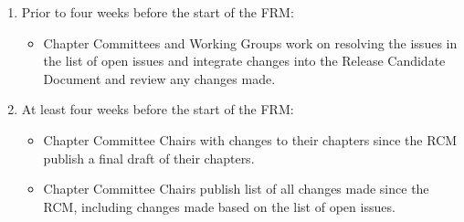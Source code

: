 {{\begin{enumerate}
\begin{enumerate}
  \item The ratification can be ``fast tracked'' if the following
    conditions are true:

    \begin{itemize}
    \item The first ballot on the Release Candidate Draft MPI Standard
      Document passed.
    \item  The list of still-unresolved issues is empty.
    \item The Forum resolved all other minor issues, such as
      formatting and whitespace problems, spelling errors, and other
      typos, and the MPI Standard Document Editor has produced a new
      Release Candidate Document containing all these fixes.
    \item After a new Release Candidate Document is available, the
      Forum decides, via special formal ballot, to ``fast track'' the
      ratification.  The ballot passes if:
      \begin{enumerate}
      \item The ballot meets the requirements for the individual
        ballot quorum, and
      \item There are zero ``no'' votes.
      \end{enumerate}
    \end{itemize}

    \item If all conditions are met, the ratification is fast tracked,
      steps 6 through 9b) are skipped, and step 9c) can be performed
      at the RCM.
  \end{enumerate}

\item Prior to four weeks before the start of the FRM:
  \label{subsec:official-ballot-voting:t-4weeks-frm}
  \begin{itemize}
  \item Chapter Committees and Working Groups work on resolving the
    issues in the list of open issues and integrate changes into the
    Release Candidate Document and review any changes made.
  \end{itemize}

\item At least four weeks before the start of the FRM:
  \begin{itemize}
  \item Chapter Committee Chairs with changes to their chapters since
    the RCM publish a final draft of their chapters.
  \item Chapter Committee Chairs publish list of all changes made
    since the RCM, including changes made based on the list of open
    issues.
  \end{itemize}


\end{enumerate}}}
